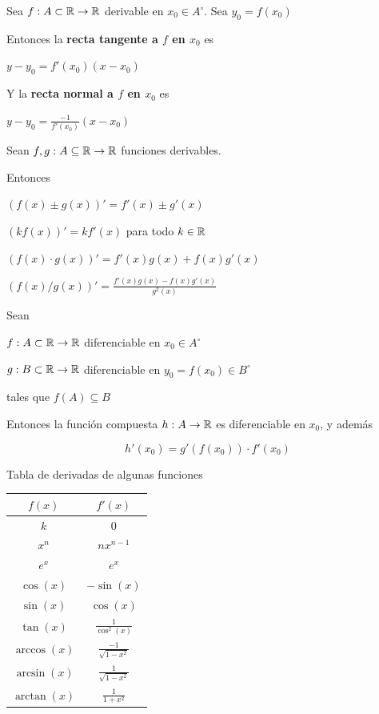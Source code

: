 \begin{definition}
Sea $f : A \subset \mathbb{R} \to \mathbb{R}$ derivable en $x_0 \in A^{\circ}$.  Sea $y_0 = f(x_0)$

Entonces la \textbf{recta tangente a $f$ en $x_0$} es

$ y - y_0 = f'(x_0) (x - x_0)$

Y la \textbf{recta normal a $f$ en $x_0$} es

$ y - y_0 = \frac{-1}{f'(x_0)} (x - x_0)$
\end{definition}

\begin{observation}

Sean $f,g : A \subseteq \mathbb{R} \to \mathbb{R}$ funciones derivables.  

Entonces

$(f(x) \pm g(x))' = f'(x) \pm g'(x)$

$(k f(x))' = k f'(x) $ para todo $k \in \mathbb{R}$

$(f(x) \cdot g(x))' = f'(x) g(x) + f(x) g'(x)$

$(f(x) / g(x))' = \frac{ f'(x) g(x) - f(x) g'(x) }{ g^2(x) }$
\end{observation}

\begin{theorem} \label{regla_cadena} 

Sean

$ f : A \subset \mathbb{R} \to \mathbb{R}$ diferenciable en $x_0 \in A^{\circ}$

$ g : B \subset \mathbb{R} \to \mathbb{R}$ diferenciable en $y_0 = f(x_0) \in B^{\circ}$

tales que $f(A) \subseteq B$

Entonces la función compuesta $h : A \to \mathbb{R}$ es diferenciable en $x_0$, y además 

$$ h'(x_0) = g'(f(x_0)) \cdot f'(x_0) $$
\end{theorem} 

Tabla de derivadas de algunas funciones

\begin{center}
\begin{tabular}{|c|c|}
\hline
$f(x)$ & $f'(x)$ \\
\hline
$k$ & $0$ \\
\hline
$x^n$ & $n x^{n-1}$ \\
\hline
$e^x$ & $e^x$ \\
\hline
$\cos(x)$ & $-\sin(x)$ \\
\hline
$\sin(x)$ & $\cos(x)$ \\
\hline
$\tan(x)$ & $\frac{1}{\cos^2(x)}$ \\
\hline
$\arccos(x)$ & $\frac{-1}{ \sqrt{1 - x^2} }$ \\
\hline
$\arcsin(x)$ & $\frac{1}{ \sqrt{1 - x^2} }$ \\
\hline
$\arctan(x)$ & $\frac{1}{1 + x^2}$ \\
\hline
\end{tabular}
\end{center}

